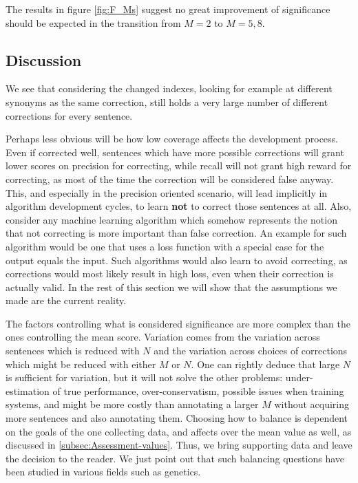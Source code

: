 		The results in figure \ref{fig:F_Ms} suggest no great improvement of significance should be expected in the transition from $M=2$ to $M=5,8$.
		
		\subsection{Discussion}
		We see that considering the changed indexes, looking for example at different synonyms as the same correction, still holds a very large number of different corrections for every sentence.
		
		Perhaps less obvious will be how low coverage affects the development
		process. Even if corrected well, sentences which have more possible
		corrections will grant lower scores on precision for correcting, while recall will not grant high reward for correcting, as most of the time the correction will be considered false anyway. This, and especially in the precision oriented scenario, will lead implicitly in algorithm development cycles, to learn \textbf{not} to correct those sentences at all. Also, consider any machine learning algorithm which somehow represents the notion that not correcting is more important than false correction. An example for such algorithm would be one that uses a loss function with a special case for the output equals the input. Such algorithms would also learn to avoid correcting, as corrections would most likely result in high loss, even when their correction is actually valid.
		In the rest of this section we will show that the assumptions we made are the current reality. 
		
		The factors controlling what is considered significance are more complex than the ones controlling the mean score. Variation comes from the variation across sentences which is reduced with $N$ and the variation across choices of corrections which might be reduced with either $M$ or $N$. One can rightly deduce that large $N$ is sufficient for variation, but it will not solve the other problems: under-estimation of true performance,
		over-conservatism, possible issues when training systems, and might be more costly than annotating a larger $M$ without acquiring more sentences and also annotating them.
		Choosing how to balance is dependent on the goals of the one collecting data, and affects over the mean value as well, as discussed in \ref{subsec:Assessment-values}. Thus, we bring supporting data and leave the decision to the reader. We just point out that such balancing questions have been studied in various fields such as genetics\cite{ionita2010optimal}.
		
